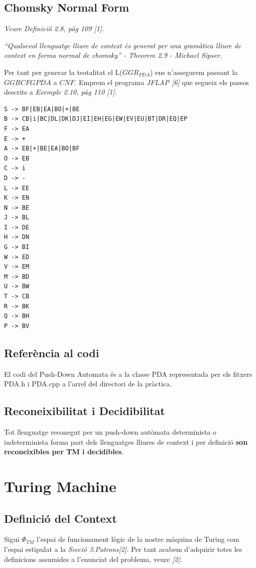 \documentclass[12pt,a4paper]{report}
\def \pdaCFG{$GGRCFG{PDA} $}
\def \pda{$GGR_{PDA} $}
\def \contextTM{$\Phi_{TM}$}
\begin{document}
\section{Chomsky Normal Form}

\textit{Veure Definició 2.8, pàg 109 [1]}.

\textit{“Qualsevol llenguatge lliure de context és generat per una gramàtica lliure de context en forma normal de chomsky” - Theorem 2.9 - Michael Sipser}.

Per tant per generar la teotalitat el L(\pda{}) ens n’assegurem passant la \pdaCFG{} a $CNF$. Emprem el programa \textit{JFLAP [6]} que segueix els passos descrits a \textit{Exemple 2.10, pàg 110 [1]}.

\begin{lstlisting}
S -> BF|EB|EA|BO|+|BE
B -> CB|i|BC|DL|DK|DJ|EI|EH|EG|EW|EV|EU|BT|DR|EQ|EP
F -> EA
E -> +
A -> EB|+|BE|EA|BO|BF
O -> EB
C -> i
D -> -
L -> EE
K -> EN
N -> BE
J -> BL
I -> DE
H -> DN
G -> BI
W -> ED
V -> EM
M -> BD
U -> BW
T -> CB
R -> BK
Q -> BH
P -> BV
\end{lstlisting}

\section{Referència al codi}

El codi del Push-Down Automata és a la classe PDA representada per els fitxers PDA.h i PDA.cpp a l'arrel del directori de la pràctica.

\section{Reconeixibilitat i Decidibilitat}

Tot llenguatge reconegut per un push-down autòmata determinista o indeterminista forma part dels llenguatges lliures de context i per definició \textbf{son reconeixibles per TM i decidibles}.


\clearpage

\chapter{Turing Machine}

\section{Definició del Context}

Sigui \contextTM{} l'espai de funcionament lògic de la nostre màquina de Turing com l'espai estipulat a la \textit{Secció 3.Patrons[2]}. Per tant acabem d'adquirir totes les definicions assumides a l'enunciat del problema, veure \textit{[2]}.
\end{document}
